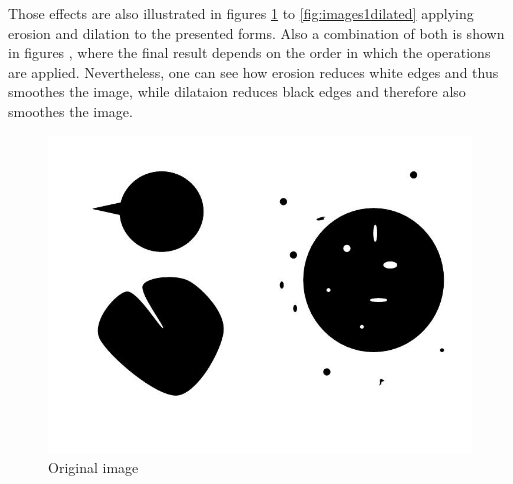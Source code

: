 Those effects are also illustrated in figures \ref{fig:images1}  to \ref{fig:images1dilated}  applying erosion and dilation to the presented forms. Also a combination of both is shown in figures  , where the final result depends on the order in which the operations are applied. Nevertheless, one can see how erosion reduces white edges and thus smoothes the image, while dilataion reduces black edges and therefore also smoothes the image. 

\begin{figure}[H]
	\centering
		\includegraphics[scale=0.2]{images/Images1.jpg}
		\caption{Original image}
		\label{fig:images1}
\end{figure}

